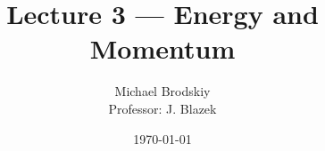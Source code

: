


\title{Lecture 3 — Energy and Momentum}
\date{\today}
\author{Michael Brodskiy\\ \small Professor: J. Blazek}



\maketitle

